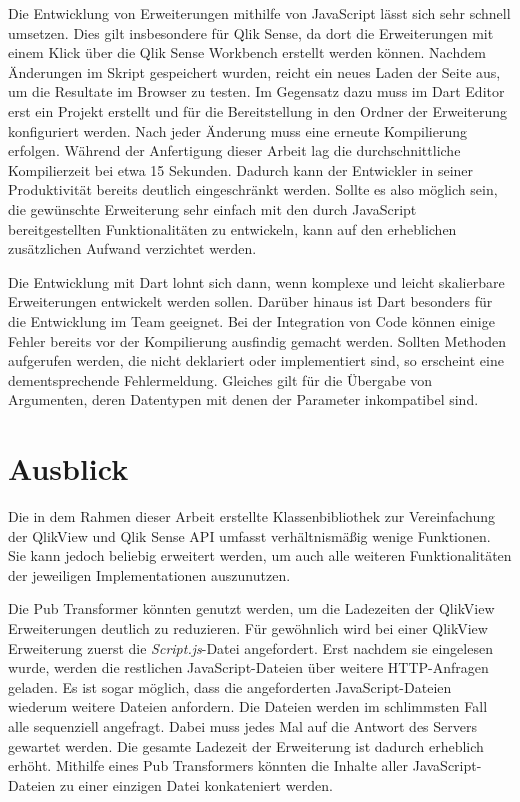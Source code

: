 Die Entwicklung von Erweiterungen mithilfe von JavaScript lässt sich sehr schnell umsetzen. Dies gilt insbesondere für Qlik Sense, da dort die Erweiterungen mit einem Klick über die Qlik Sense Workbench erstellt werden können. Nachdem Änderungen im Skript gespeichert wurden, reicht ein neues Laden der Seite aus, um die Resultate im Browser zu testen. Im Gegensatz dazu muss im Dart Editor erst ein Projekt erstellt und für die Bereitstellung in den Ordner der Erweiterung konfiguriert werden. Nach jeder Änderung muss eine erneute Kompilierung erfolgen. Während der Anfertigung dieser Arbeit lag die durchschnittliche Kompilierzeit bei etwa 15 Sekunden. Dadurch kann der Entwickler in seiner Produktivität bereits deutlich eingeschränkt werden. Sollte es also möglich sein, die gewünschte Erweiterung sehr einfach mit den durch JavaScript bereitgestellten Funktionalitäten zu entwickeln, kann auf den erheblichen zusätzlichen Aufwand verzichtet werden.

Die Entwicklung mit Dart lohnt sich dann, wenn komplexe und leicht skalierbare Erweiterungen entwickelt werden sollen. Darüber hinaus ist Dart besonders für die Entwicklung im Team geeignet. Bei der Integration von Code können einige Fehler bereits vor der Kompilierung ausfindig gemacht werden. Sollten Methoden aufgerufen werden, die nicht deklariert oder implementiert sind, so erscheint eine dementsprechende Fehler\-meldung. Gleiches gilt für die Übergabe von Argumenten, deren Daten\-typen mit denen der Parameter inkompatibel sind.



\section{Ausblick}
\label{lab:Ausblick}

Die in dem Rahmen dieser Arbeit erstellte Klassen\-bibliothek zur Vereinfachung der QlikView und Qlik Sense API umfasst verhältnismäßig wenige Funktionen. Sie kann jedoch beliebig erweitert werden, um auch alle weiteren Funktionalitäten der jeweiligen Implementationen auszunutzen.

Die Pub Transformer könnten genutzt werden, um die Ladezeiten der QlikView Erweiterungen deutlich zu reduzieren. Für gewöhnlich wird bei einer QlikView Erweiterung zuerst die \textit{Script.js}-Datei angefordert. Erst nachdem sie eingelesen wurde, werden die restlichen JavaScript-Dateien über weitere HTTP-Anfragen geladen. Es ist sogar möglich, dass die angeforderten JavaScript-Dateien wiederum weitere Dateien anfordern. Die Dateien werden im schlimmsten Fall alle sequenziell angefragt. Dabei muss jedes Mal auf die Antwort des Servers gewartet werden. Die gesamte Ladezeit der Erweiterung ist dadurch erheblich erhöht. Mithilfe eines Pub Transformers könnten die Inhalte aller JavaScript-Dateien zu einer einzigen Datei konkateniert werden.

